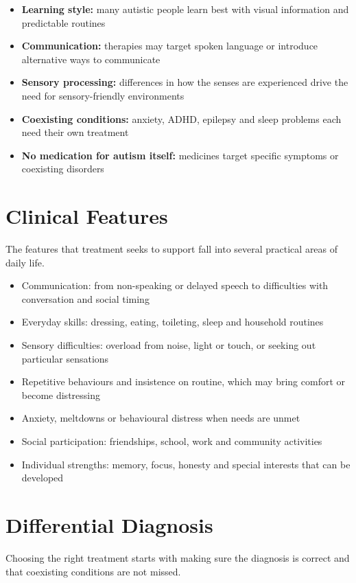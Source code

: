 \begin{itemize}
    \item \textbf{Learning style:} many autistic people learn best with visual information and predictable routines
    \item \textbf{Communication:} therapies may target spoken language or introduce alternative ways to communicate
    \item \textbf{Sensory processing:} differences in how the senses are experienced drive the need for sensory-friendly environments
    \item \textbf{Coexisting conditions:} anxiety, ADHD, epilepsy and sleep problems each need their own treatment
    \item \textbf{No medication for autism itself:} medicines target specific symptoms or coexisting disorders
\end{itemize}

\section*{Clinical Features}
The features that treatment seeks to support fall into several practical areas of daily life.

\begin{itemize}
    \item Communication: from non-speaking or delayed speech to difficulties with conversation and social timing
    \item Everyday skills: dressing, eating, toileting, sleep and household routines
    \item Sensory difficulties: overload from noise, light or touch, or seeking out particular sensations
    \item Repetitive behaviours and insistence on routine, which may bring comfort or become distressing
    \item Anxiety, meltdowns or behavioural distress when needs are unmet
    \item Social participation: friendships, school, work and community activities
    \item Individual strengths: memory, focus, honesty and special interests that can be developed
\end{itemize}

\section*{Differential Diagnosis}
Choosing the right treatment starts with making sure the diagnosis is correct and that coexisting conditions are not missed.

